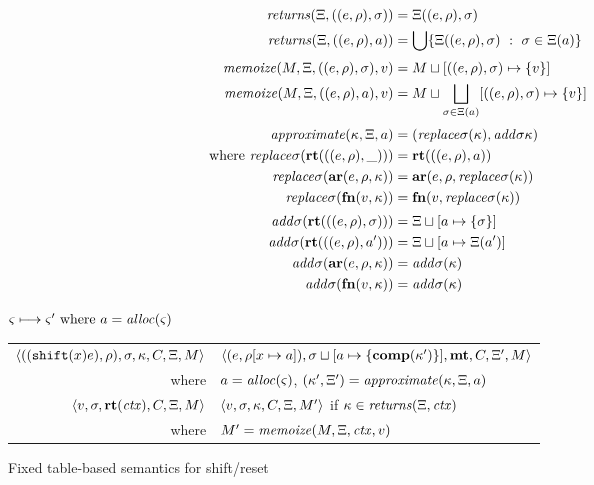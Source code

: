 \documentclass{llncs}
\begin{document}
\newcommand{\replacectx}{\mathit{replace}\mstore}
\newcommand{\addstore}{\mathit{add}\mstore}
\begin{align*}
  \returns(\mktab, ((\mexpr,\menv), \mstore)) &= \mktab((\mexpr,\menv), \mstore) \\
  \returns(\mktab, ((\mexpr,\menv), \maddr)) &=
    \bigcup\setbuild{\mktab((\mexpr,\menv),\mstore)}{\mstore \in \mktab(\maddr)}
  \\[2pt]
  \memoize(\mmemo, \mktab, ((\mexpr,\menv), \mstore), \mval) &=
    \joinone{\mmemo}{((\mexpr,\menv), \mstore)}{\mval} \\
  \memoize(\mmemo, \mktab, ((\mexpr,\menv), \maddr), \mval) &=
    \mmemo \sqcup \bigsqcup\limits_{\mstore \in \mktab(\maddr)}\snglm{((\mexpr,\menv), \mstore)}{\mval}
  \\[2pt]
  \approximate(\mkont, \mktab, \maddr) &= (\replacectx(\mkont), \addstore{\mkont}) \\
  \text{where }
   \replacectx(\krt{((\mexpr,\menv),\_)}) &= \krt{((\mexpr,\menv),\maddr)} \\
   \replacectx(\kar{\mexpr,\menv,\mkont}) &= \kar{\mexpr,\menv,\replacectx(\mkont)} \\
   \replacectx(\kfn{\mval, \mkont}) &= \kfn{\mval,\replacectx(\mkont)}
  \\[2pt]
   \addstore(\krt{((\mexpr,\menv),\mstore)}) &= \joinone{\mktab}{\maddr}{\mstore} \\
   \addstore(\krt{((\mexpr,\menv),\maddr')}) &= \joinm{\mktab}{\maddr}{\mktab(\maddr')} \\
   \addstore(\kar{\mexpr,\menv,\mkont}) &= \addstore(\mkont) \\
   \addstore(\kfn{\mval, \mkont}) &= \addstore(\mkont)
\end{align*}

\begin{figure}
  \centering
  $\varsigma \longmapsto \varsigma' \text{ where } a = \mathit{alloc}(\varsigma)$ \\
  \begin{tabular}{r|l}
    \hline
    $\langle ((\texttt{shift} (x) e), \rho), \sigma, \kappa, C, \Xi, M \rangle$
    &
    $\langle (e, \rho[x \mapsto a]), \sigma\sqcup[a \mapsto \{ \mathbf{comp}(\kappa') \}],\mathbf{mt},C,\Xi',M \rangle$
    \\
    where & $a = \mathit{alloc}(\varsigma)$, $(\kappa',\Xi') = \mathit{approximate}(\kappa, \Xi, a)$
\\
   $\langle v, \sigma, \mathbf{rt}(\mathit{ctx}), C, \Xi, M \rangle$
   &
   $\langle v, \sigma, \kappa, C, \Xi, M' \rangle$
   if $\kappa \in \mathit{returns}(\Xi, \mathit{ctx})$
   \\
   where & $M' = \mathit{memoize}(M, \Xi, \mathit{ctx}, v)$
  \end{tabular}
  \caption{Fixed table-based semantics for shift/reset}
  \label{fig:shift-reset-table1}
\end{figure}
\end{document}
